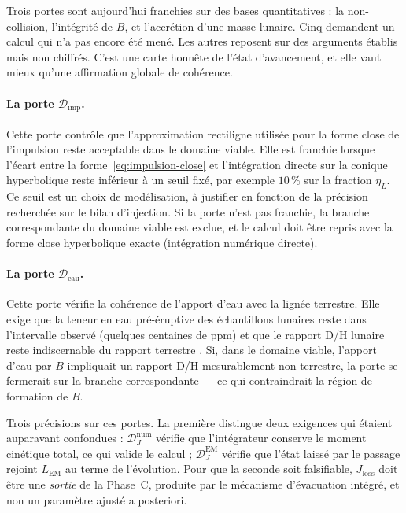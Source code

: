 \documentclass[11pt,a4paper,openany]{report}
\begin{document}
Trois portes sont aujourd'hui franchies sur des bases quantitatives : la non-collision,
l'intégrité de $B$, et l'accrétion d'une masse lunaire. Cinq demandent un calcul qui n'a pas
encore été mené. Les autres reposent sur des arguments établis mais non chiffrés. C'est une carte
honnête de l'état d'avancement, et elle vaut mieux qu'une affirmation globale de cohérence.

\paragraph{La porte $\mathcal{D}_{\mathrm{imp}}$.}
Cette porte contrôle que l'approximation rectiligne utilisée pour la forme close de l'impulsion
reste acceptable dans le domaine viable. Elle est franchie lorsque l'écart entre la
forme~\eqref{eq:impulsion-close} et l'intégration directe sur la conique hyperbolique reste
inférieur à un seuil fixé, par exemple $10\,\%$ sur la fraction $\eta_L$. Ce seuil est un choix
de modélisation, à justifier en fonction de la précision recherchée sur le bilan d'injection. Si la
porte n'est pas franchie, la branche correspondante du domaine viable est exclue, et le calcul doit
être repris avec la forme close hyperbolique exacte (intégration numérique directe).

\paragraph{La porte $\mathcal{D}_{\mathrm{eau}}$.}
Cette porte vérifie la cohérence de l'apport d'eau avec la lignée terrestre. Elle exige que la
teneur en eau pré-éruptive des échantillons lunaires reste dans l'intervalle observé (quelques
centaines de ppm) et que le rapport D/H lunaire reste indiscernable du rapport terrestre
\cite{Saal2008,Saal2013}. Si, dans le domaine viable, l'apport d'eau par $B$ impliquait un rapport
D/H mesurablement non terrestre, la porte se fermerait sur la branche correspondante — ce qui
contraindrait la région de formation de $B$.

Trois précisions sur ces portes. La première distingue deux exigences qui étaient auparavant
confondues : $\mathcal{D}_J^{\mathrm{num}}$ vérifie que l'intégrateur conserve le moment cinétique
total, ce qui valide le calcul ; $\mathcal{D}_J^{\mathrm{EM}}$ vérifie que l'état laissé par le
passage rejoint $L_{\mathrm{EM}}$ au terme de l'évolution. Pour que la seconde soit falsifiable,
$J_{\mathrm{loss}}$ doit être une \emph{sortie} de la Phase~C, produite par le mécanisme
d'évacuation intégré, et non un paramètre ajusté a posteriori.
\end{document}
